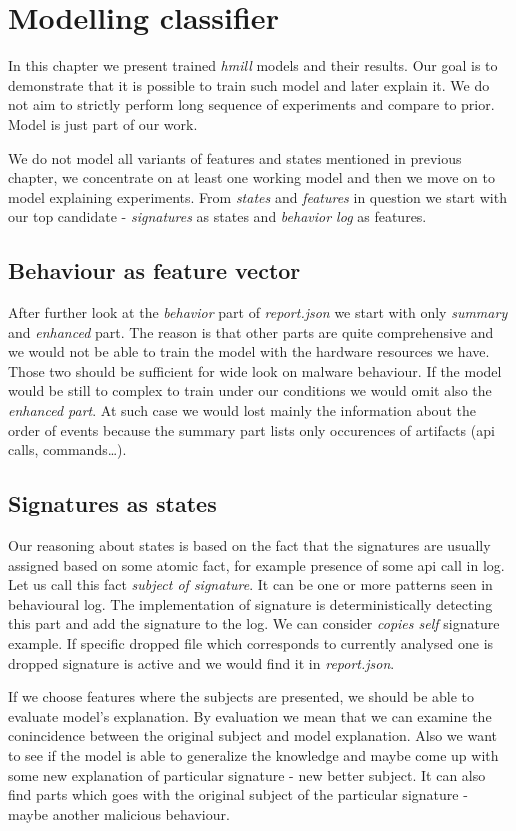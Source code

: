 \chapter{Modelling classifier} \label{chap:models}
In this chapter we present trained \emph{hmill} models and their results. Our goal is to demonstrate that it is possible to train such model and later explain it. We do not aim to strictly perform long sequence of experiments and compare to prior. Model is just part of our work.

We do not model all variants of features and states mentioned in previous chapter, we concentrate on at least one working model and then we move on to model explaining experiments. From \emph{states} and \emph{features} in question we start with our top candidate - \emph{signatures} as states and \emph{behavior log} as features. 

\section{Behaviour as feature vector}
After further look at the \emph{behavior} part of \emph{report.json} we start with only \emph{summary} and \emph{enhanced} part. The reason is that other parts are quite comprehensive and we would not be able to train the model with the hardware resources we have. Those two should be sufficient for wide look on malware behaviour. If the model would be still to complex to train under our conditions we would omit also the \emph{enhanced part}. At such case we would lost mainly the information about the order of events because the summary part lists only occurences of artifacts (api calls, commands\dots).

\section{Signatures as states}
Our reasoning about states is based on the fact that the signatures are usually assigned based on some atomic fact, for example presence of some api call in log. Let us call this fact \emph{subject of signature}. It can be one or more patterns seen in behavioural log. The implementation of signature is deterministically detecting this part and add the signature to the log. We can consider \emph{copies self} signature example. If specific dropped file which corresponds to currently analysed one is dropped signature is active and we would find it in \emph{report.json}.

If we choose features where the subjects are presented, we should be able to evaluate model's explanation. By evaluation we mean that we can examine the conincidence between the original subject and model explanation. Also we want to see if the model is able to generalize the knowledge and maybe come up with some new explanation of particular signature - new better subject. It can also find parts which goes with the original subject of the particular signature - maybe another malicious behaviour.

